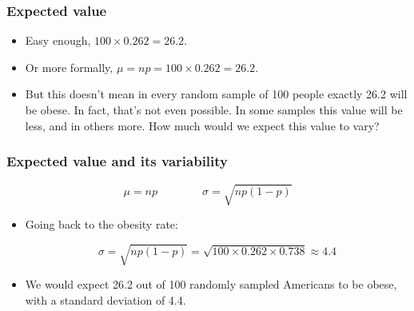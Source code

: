 
\begin{frame}
\frametitle{Expected value}


\pause

\begin{itemize}

\item Easy enough, $100 \times 0.262 = 26.2$.

\pause

\item Or more formally, $\mu = np = 100 \times 0.262 = 26.2$.

\pause

\item But this doesn't mean in every random sample of 100 people exactly 26.2 will be obese. In fact, that's not even possible. In some samples this value will be less, and in others more. How much would we expect this value to vary?

\end{itemize}

\end{frame}


\begin{frame}
\frametitle{Expected value and its variability}

{\[ \mu = np \qquad \qquad \sigma = \sqrt{np(1-p)} \] }

\pause

\begin{itemize}

\item Going back to the obesity rate:

\[ \sigma = \sqrt{np(1-p)} = \sqrt{100 \times 0.262 \times 0.738} \approx  4.4\]

\pause

\item We would expect 26.2 out of 100 randomly sampled Americans to be obese, with a standard deviation of 4.4.

\end{itemize}


\end{frame}


